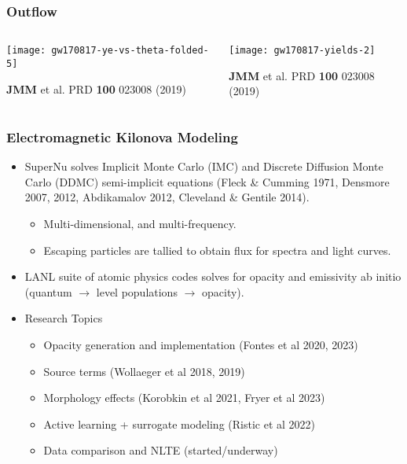 \documentclass[]{beamer}
\begin{document}
\begin{frame}
  \frametitle{Outflow}
  \begin{columns}
    \begin{column}{6cm}
      \texttt{[image: gw170817-ye-vs-theta-folded-5]}\\
      \begin{tiny}
        \textbf{JMM} et al. PRD \textbf{100} 023008 (2019)
      \end{tiny}
    \end{column}
    \begin{column}{6cm}
      \begin{center}
        \texttt{[image: gw170817-yields-2]}
      \end{center}
      \begin{tiny}
        \textbf{JMM} et al. PRD \textbf{100} 023008 (2019)
      \end{tiny}
    \end{column}    
  \end{columns}
\end{frame}

\begin{frame}
  \frametitle{Electromagnetic Kilonova Modeling}
  \begin{itemize}
  \item SuperNu solves Implicit Monte Carlo (IMC) and Discrete
    Diffusion Monte Carlo (DDMC) semi-implicit equations (Fleck \&
    Cumming 1971, Densmore 2007, 2012, Abdikamalov 2012, Cleveland \&
    Gentile 2014).
    \begin{itemize}
    \item Multi-dimensional, and multi-frequency.
    \item Escaping particles are tallied to obtain flux for spectra
      and light curves.
    \end{itemize}
  \item LANL suite of atomic physics codes solves for opacity and
    emissivity ab initio (quantum $\to$ level populations $\to$ opacity).
  \item Research Topics
    \begin{itemize}
    \item Opacity generation and implementation (Fontes et al 2020, 2023)
    \item Source terms (Wollaeger et al 2018, 2019)
    \item Morphology effects (Korobkin et al 2021, Fryer et al 2023)
    \item Active learning + surrogate modeling (Ristic et al 2022)
    \item Data comparison and NLTE (started/underway)
    \end{itemize}
  \end{itemize}
\end{frame}
\end{document}
